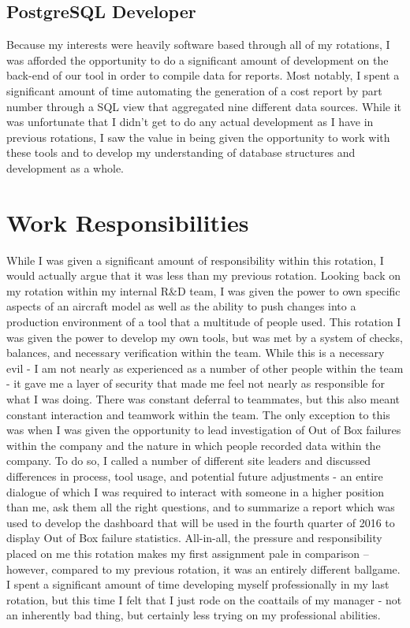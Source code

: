 \documentclass{article}
\begin{document}
\subsection{PostgreSQL Developer}
Because my interests were heavily software based through all of my rotations, I was afforded the opportunity to do a significant amount of development on the back-end of our tool in order to compile data for reports. Most notably, I spent a significant amount of time automating the generation of a cost report by part number through a SQL view that aggregated nine different data sources.
While it was unfortunate that I didn't get to do any actual development as I have in previous rotations, I saw the value in being given the opportunity to work with these tools and to develop my understanding of database structures and development as a whole.

\section{Work Responsibilities}
While I was given a significant amount of responsibility within this rotation, I would actually argue that it was less than my previous rotation. Looking back on my rotation within my internal R&D team, I was given the power to own specific aspects of an aircraft model as well as the ability to push changes into a production environment of a tool that a multitude of people used.
This rotation I was given the power to develop my own tools, but was met by a system of checks, balances, and necessary verification within the team. While this is a necessary evil - I am not nearly as experienced as a number of other people within the team - it gave me a layer of security that made me feel not nearly as responsible for what I was doing. 
There was constant deferral to teammates, but this also meant constant interaction and teamwork within the team.
The only exception to this was when I was given the opportunity to lead investigation of Out of Box failures within the company and the nature in which people recorded data within the company. To do so, I called a number of different site leaders and discussed differences in process, tool usage, and potential future adjustments - an entire dialogue of which I was required to interact with someone in a higher position than me, ask them all the right questions, and to summarize a report which was used to develop the dashboard that will be used in the fourth quarter of 2016 to display Out of Box failure statistics.
All-in-all, the pressure and responsibility placed on me this rotation makes my first assignment pale in comparison -- however, compared to my previous rotation, it was an entirely different ballgame. I spent a significant amount of time developing myself professionally in my last rotation, but this time I felt that I just rode on the coattails of my manager - not an inherently bad thing, but certainly less trying on my professional abilities.
\end{document}
